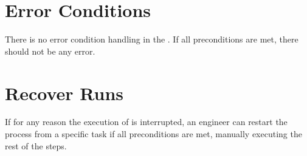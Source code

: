 \section{Error Conditions}


There is no error condition handling in the \FAQAS. If all preconditions are met, there should not be any error.

\section{Recover Runs}


If for any reason the execution of \DAMA is interrupted, an engineer can restart the process from a specific task if all preconditions are met, manually executing the rest of the steps.
